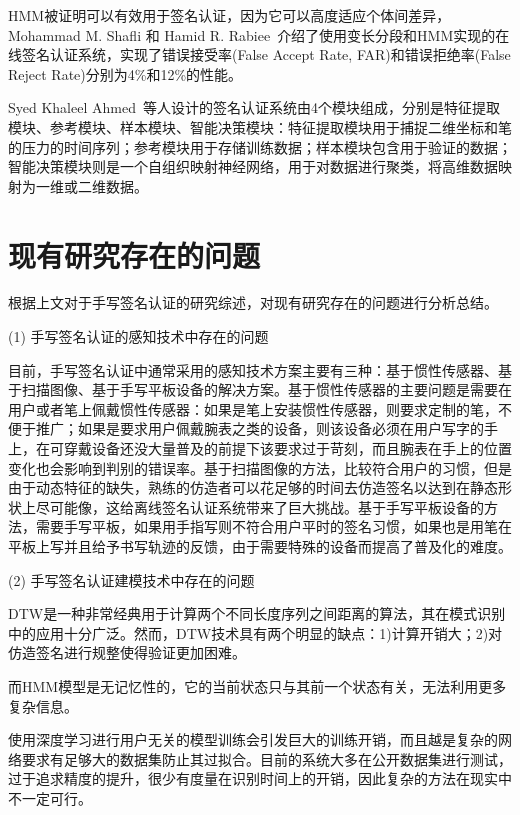 HMM被证明可以有效用于签名认证，因为它可以高度适应个体间差异，Mohammad M. Shafli 和 Hamid R. Rabiee~\cite{shafiei2003new}介绍了使用变长分段和HMM实现的在线签名认证系统，实现了错误接受率(False Accept Rate, FAR)和错误拒绝率(False Reject Rate)分别为4\%和12\%的性能。

Syed Khaleel Ahmed~\cite{ahmed2009automatic}等人设计的签名认证系统由4个模块组成，分别是特征提取模块、参考模块、样本模块、智能决策模块：特征提取模块用于捕捉二维坐标和笔的压力的时间序列；参考模块用于存储训练数据；样本模块包含用于验证的数据；智能决策模块则是一个自组织映射神经网络，用于对数据进行聚类，将高维数据映射为一维或二维数据。%

\section{现有研究存在的问题}
根据上文对于手写签名认证的研究综述，对现有研究存在的问题进行分析总结。

(1) 手写签名认证的感知技术中存在的问题

目前，手写签名认证中通常采用的感知技术方案主要有三种：基于惯性传感器、基于扫描图像、基于手写平板设备的解决方案。基于惯性传感器的主要问题是需要在用户或者笔上佩戴惯性传感器：如果是笔上安装惯性传感器，则要求定制的笔，不便于推广；如果是要求用户佩戴腕表之类的设备，则该设备必须在用户写字的手上，在可穿戴设备还没大量普及的前提下该要求过于苛刻，而且腕表在手上的位置变化也会影响到判别的错误率。基于扫描图像的方法，比较符合用户的习惯，但是由于动态特征的缺失，熟练的仿造者可以花足够的时间去仿造签名以达到在静态形状上尽可能像，这给离线签名认证系统带来了巨大挑战。基于手写平板设备的方法，需要手写平板，如果用手指写则不符合用户平时的签名习惯，如果也是用笔在平板上写并且给予书写轨迹的反馈，由于需要特殊的设备而提高了普及化的难度。

(2) 手写签名认证建模技术中存在的问题

DTW是一种非常经典用于计算两个不同长度序列之间距离的算法，其在模式识别中的应用十分广泛。然而，DTW技术具有两个明显的缺点：1)计算开销大；2)对仿造签名进行规整使得验证更加困难。

而HMM模型是无记忆性的，它的当前状态只与其前一个状态有关，无法利用更多复杂信息。

使用深度学习进行用户无关的模型训练会引发巨大的训练开销，而且越是复杂的网络要求有足够大的数据集防止其过拟合。目前的系统大多在公开数据集进行测试，过于追求精度的提升，很少有度量在识别时间上的开销，因此复杂的方法在现实中不一定可行。

